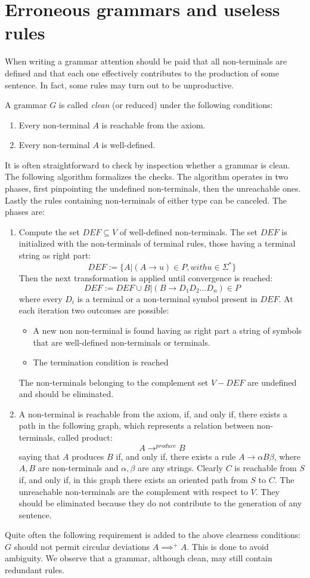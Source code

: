 \section{Erroneous grammars and useless rules}

When writing a grammar attention should be paid that all non-terminals are defined and that each one effectively contributes to the production of some sentence. 
In fact, some rules may turn out to be unproductive. 
\begin{definition}
    A grammar $G$ is called \emph{clean} (or reduced) under the following conditions:
    \begin{enumerate}
        \item Every non-terminal $A$ is reachable from the axiom.
        \item Every non-terminal $A$ is well-defined.
    \end{enumerate}
\end{definition}
It is often straightforward to check by inspection whether a grammar is clean. The following algorithm formalizes the checks. The algorithm operates in two phases, 
first pinpointing the undefined non-terminals, then the unreachable ones. Lastly the rules containing non-terminals of either type can be canceled. The phases are: 
\begin{enumerate}
    \item Compute the set $DEF\subseteq V$ of well-defined non-terminals. The set $DEF$ is initialized with the non-terminals of terminal rules, those having a 
        terminal string as right part:
        \[DEF:=\{A|( A \rightarrow u ) \in P,with u \in \Sigma^{*}\}\]
        Then the next transformation is applied until convergence is reached:
        \[DEF:=DEF \cup B|( B \rightarrow D_1D_2\dots D_n)\in P\]
        where every $D_i$ is a terminal or a non-terminal symbol present in $DEF$. At each iteration two outcomes are possible:
        \begin{itemize}
            \item A new non non-terminal is found having as right part a string of symbols that are well-defined non-terminals or terminals. 
            \item The termination condition is reached
        \end{itemize}
        The non-terminals belonging to the complement set $V-DEF$ are undefined and should be eliminated.
    \item A non-terminal is reachable from the axiom, if, and only if, there exists a path in the following graph, which represents a relation between non-terminals,
        called product:
        \[A \rightarrow^{produce} B\]
        saying that $A$ produces $B$ if, and only if, there exists a rule $A \rightarrow \alpha B \beta$, where $A,B$ are non-terminals and $\alpha,\beta$ are any strings.
        Clearly $C$ is reachable from $S$ if, and only if, in this graph there exists an oriented path from $S$ to $C$. The unreachable non-terminals are the complement
        with respect to $V$. They should be eliminated because they do not contribute to the generation of any sentence.
\end{enumerate}
Quite often the following requirement is added to the above clearness conditions: $G$ should not permit circular deviations $A \implies^{+} A$. This is done to avoid 
ambiguity. We observe that a grammar, although clean, may still contain redundant rules. 